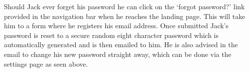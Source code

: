     Should Jack ever forget his password he can click on the `forgot password?' link provided in the navigation bar when he reaches the landing page. This will take him to a form where he registers his email address. Once submitted Jack's password is reset to a secure random eight character password which is automatically generated and is then emailed to him. He is also advised in the email to change his new password straight away, which can be done via the settings page as seen above.